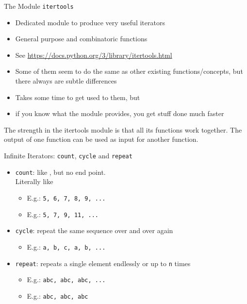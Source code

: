 
\begin{frame}{The Module \texttt{itertools}}
%
\begin{itemize}
\item Dedicated module to produce very useful iterators
\item General purpose and combinatoric functions
\item See \url{https://docs.python.org/3/library/itertools.html}
\item Some of them seem to do the same as other existing functions/concepts, but there always are subtle differences
\item Takes some time to get used to them, but
\item if you know what the module provides, you get stuff done much faster
\end{itemize}
%
\begin{hintbox}
\small
The strength in the itertools module is that all its functions work together. The output of one function can be used as input for another function.
\end{hintbox}
%
\end{frame}


\begin{frame}{Infinite Iterators: \texttt{count}, \texttt{cycle} and \texttt{repeat}}
%
\begin{itemize}
\item \texttt{count}: like , but no end point.\\
	Literally like 
	\begin{itemize}
	\item E.\;g.:  \thus \texttt{5, 6, 7, 8, 9, ...}
	\item E.\;g.:  \thus \texttt{5, 7, 9, 11, ...}
	\end{itemize}
\item \texttt{cycle}: repeat the same sequence over and over again
	\begin{itemize}
	\item E.\;g.:  \thus \texttt{a, b, c, a, b, ...}
	\end{itemize}
\item \texttt{repeat}: repeats a single element endlessly or up to \texttt{n} times
	\begin{itemize}
	\item E.\;g.:  \thus \texttt{abc, abc, abc, ...}
	\item E.\;g.:  \thus \texttt{abc, abc, abc}
	\end{itemize}
\end{itemize}
%
\end{frame}

